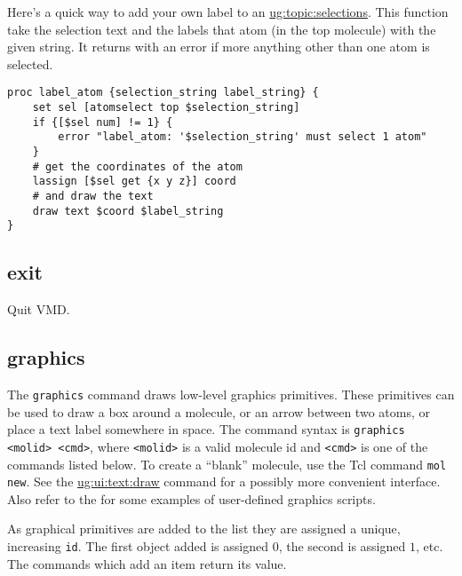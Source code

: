   Here's a quick way to add your own label to an 
\hyperref{atom selection}{atom selection [\S }{]}{ug:topic:selections}.  
This function take the selection text and the labels that
atom (in the {\sf top} molecule) with the given string.  It returns
with an error if more anything other than one atom is selected.
\begin{verbatim}
proc label_atom {selection_string label_string} {
    set sel [atomselect top $selection_string]
    if {[$sel num] != 1} {
        error "label_atom: '$selection_string' must select 1 atom"
    }
    # get the coordinates of the atom
    lassign [$sel get {x y z}] coord
    # and draw the text
    draw text $coord $label_string
}
\end{verbatim}


\subsection{exit}
Quit VMD.

\subsection{graphics}
\label{ug:ui:text:graphics}


The {\tt graphics} command draws low-level graphics primitives.
These primitives can be used to draw a box around a molecule, or an
arrow between two atoms, or place a text label somewhere in space.
The command syntax is {\tt graphics <molid> <cmd>},
where {\tt <molid>} is a valid molecule id and {\tt <cmd>} is one of the
commands listed below.  To create a ``blank'' molecule, use the Tcl command 
{\tt mol new}.  
See the 
\hyperref{draw}{draw [\S~}{]}{ug:ui:text:draw} command for a 
possibly more convenient interface.  Also refer to the 
for some examples of user-defined graphics scripts.


As graphical primitives are added to the list they are assigned a unique,
increasing {\tt id}.  The first object added is assigned $0$, the second
is assigned $1$, etc.  The commands which add an item return its value.

